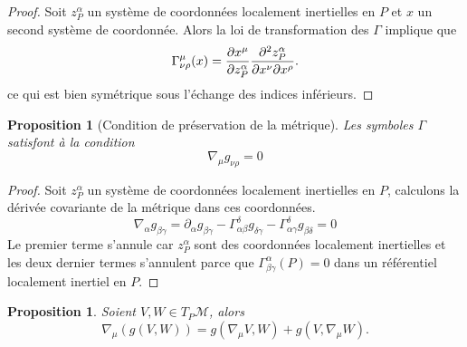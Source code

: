\documentclass[a4paper,11pt]{report}
\theoremstyle{definition}
\theoremstyle{plain}
\newtheorem{prop}[thm]{Proposition}
\theoremstyle{definition}
\theoremstyle{remark}
\newcommand{\M}{\mathscr{M}}
\newcommand{\p}{\partial}
\begin{document}
                \begin{proof}
                    Soit $z^\alpha_P$ un système de coordonnées localement inertielles en $P$ et $x$ un second système de coordonnée. Alors la loi de transformation des $\Gamma$ implique que
                    \begin{equation}
                        \Gamma^\mu_{\nu\rho}(x) = \pdv{x^\mu}{z^\alpha_P}\pdv{z^\alpha_P}{x^\nu}{x^\rho}.
                    \end{equation}
                    ce qui est bien symétrique sous l'échange des indices inférieurs.
                \end{proof}
                
                \begin{prop}[Condition de préservation de la métrique]
                    Les symboles $\Gamma$ satisfont à la condition
                    \begin{equation}
                        \nabla_\mu g_{\nu\rho} = 0
                    \end{equation}
                \end{prop}
                
                \begin{proof}
                    Soit $z^\alpha_P$ un système de coordonnées localement inertielles en $P$, calculons la dérivée covariante de la métrique dans ces coordonnées.
                    \begin{equation}
                        \nabla_\alpha g_{\beta\gamma} = \p_\alpha g_{\beta\gamma} - \Gamma^\delta_{\alpha\beta}g_{\delta\gamma} - \Gamma^\delta_{\alpha\gamma}g_{\beta\delta} = 0
                    \end{equation}
                    Le premier terme s'annule car $z^\alpha_P$ sont des coordonnées localement inertielles et les deux dernier termes s'annulent parce que  $\Gamma^\alpha_{\beta\gamma}(P) = 0$ dans un référentiel localement inertiel en $P$.
                \end{proof}
                
                \begin{prop}
                    Soient $V,W\in T_P\M$, alors
                    \begin{equation}
                        \nabla_\mu(g(V,W)) = g(\nabla_\mu V,W) + g(V,\nabla_\mu W).
                    \end{equation}
                \end{prop}
                
\end{document}
